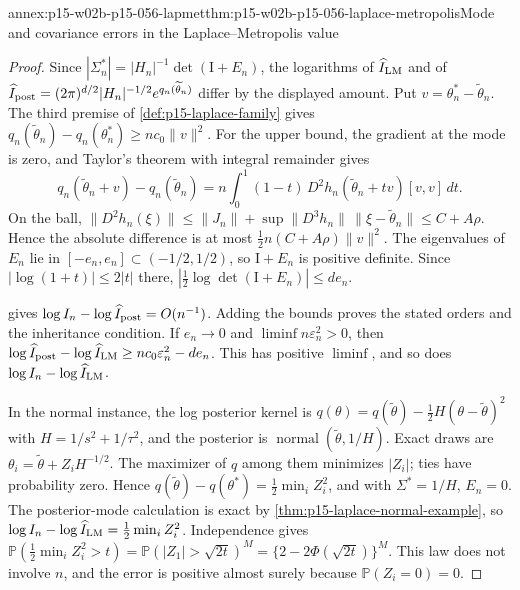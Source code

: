 \begin{annexitem}{annex:p15-w02b-p15-056-lapmet}{thm:p15-w02b-p15-056-laplace-metropolis}{Mode and covariance errors in the Laplace--Metropolis value}
\begin{proof}
Since \(|\Sigma^*_n|=|H_n|^{-1}\det(\mathrm{I}+E_n)\), the logarithms of
\(\widehat I_{\rm LM}\) and of
\(\widehat I_{\rm post}=(2\pi)^{d/2}|H_n|^{-1/2}e^{q_n(\widetilde\theta_n)}\)
differ by the displayed amount. Put
\(v=\theta^*_n-\widetilde\theta_n\). The third premise of
\cref{def:p15-laplace-family} gives
\(q_n(\widetilde\theta_n)-q_n(\theta^*_n)\geq nc_0\|v\|^2\). For the upper
bound, the gradient at the mode is zero, and Taylor's theorem with
integral remainder gives
\[
 q_n(\widetilde\theta_n+v)-q_n(\widetilde\theta_n)
 =n\int_0^1(1-t)\,D^2h_n(\widetilde\theta_n+tv)[v,v]\,dt .
\]
On the ball,
\(\|D^2h_n(\xi)\|\leq\|J_n\|+\sup\|D^3h_n\|\,\|\xi-\widetilde\theta_n\|\leq C+A\rho\).
Hence the absolute difference is at most \(\tfrac12n(C+A\rho)\|v\|^2\).
The eigenvalues of \(E_n\) lie in \([-e_n,e_n]\subset(-1/2,1/2)\), so
\(\mathrm{I}+E_n\) is positive definite. Since \(|\log(1+t)|\leq2|t|\)
there, \(|\tfrac12\log\det(\mathrm{I}+E_n)|\leq de_n\).

 gives
\(\log I_n-\log\widehat I_{\rm post}=O(n^{-1})\). Adding the bounds
proves the stated orders and the inheritance condition. If \(e_n\to0\)
and \(\liminf n\varepsilon_n^2>0\), then
\(\log\widehat I_{\rm post}-\log\widehat I_{\rm LM}\geq nc_0\varepsilon_n^2-de_n\).
This has positive \(\liminf\), and so does \(\log I_n-\log\widehat I_{\rm LM}\).

In the normal instance, the log posterior kernel is
\(q(\theta)=q(\widetilde\theta)-\tfrac12H(\theta-\widetilde\theta)^2\)
with \(H=1/s^2+1/\tau^2\), and the posterior is
\(\operatorname{normal}(\widetilde\theta,1/H)\). Exact draws are
\(\theta_i=\widetilde\theta+Z_iH^{-1/2}\). The maximizer of \(q\) among
them minimizes \(|Z_i|\); ties have probability zero. Hence
\(q(\widetilde\theta)-q(\theta^*)=\tfrac12\min_iZ_i^2\), and with
\(\Sigma^*=1/H\), \(E_n=0\). The posterior-mode calculation is exact by
\cref{thm:p15-laplace-normal-example}, so
\(\log I_n-\log\widehat I_{\rm LM}=\tfrac12\min_iZ_i^2\). Independence
gives \(\mathbb P(\tfrac12\min_iZ_i^2>t)=\mathbb P(|Z_1|>\sqrt{2t})^M
=\{2-2\Phi(\sqrt{2t})\}^M\). This law does not involve \(n\), and the
error is positive almost surely because \(\mathbb P(Z_i=0)=0\).
\end{proof}
\end{annexitem}

